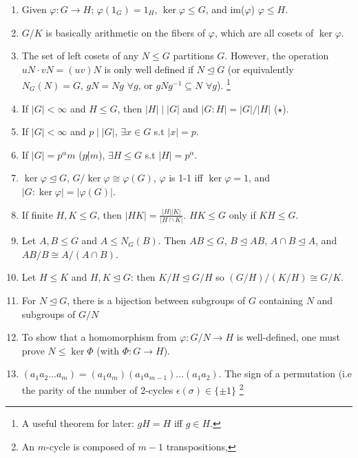 \documentclass{article}
\begin{document}
\begin{enumerate}[1.]
    \item Given $\varphi : G \rightarrow H$; $\varphi(1_G) = 1_H$,
        $\ker \varphi \leq G$, and im($\varphi$) $\varphi \leq H$.
    \item $G/K$ is basically arithmetic on the fibers of $\varphi$, which
        are all cosets of $\ker \varphi$.
    \item The set of left cosets of any $N \leq G$ partitions $G$. However,
        the operation $uN \cdot vN = (uv)N$ is only well defined if $N
        \trianglelefteq G$ (or equivalently $N_G(N) = G$, $gN = Ng$ $\forall
        g$, or $gNg^{-1} \subseteq N$ $\forall g$).
        \footnote{A useful theorem for later: $gH = H$ iff $g \in H$.}
    \item If $|G| < \infty$ and $H \leq G$, then $|H| \mid |G|$ and
        $|G : H| = |G|/|H|$ ($\star$).
    \item If $|G| < \infty$ and $p \mid |G|$, $\exists x \in G$ s.t $|x| =
        p$.
    \item If $|G| = p^{\alpha}m$ ($p \not| m$), $\exists H \leq G$ s.t $|H|
        = p^{\alpha}$.
    \item $\ker \varphi \trianglelefteq G$, $G/\ker \varphi \cong
        \varphi(G)$, $\varphi$ is 1-1 iff $\ker \varphi = 1$, and
        $|G : \ker \varphi| = |\varphi(G)|$.
    \item If finite $H, K \leq G$, then $|HK| = \frac{|H||K|}{|H \cap K|}$.
        $HK \leq G$ only if $KH \leq G$.
    \item Let $A,B \leq G$ and $A \leq N_G(B)$. Then $AB \leq G$, $B
        \trianglelefteq AB$, $A \cap B \trianglelefteq A$, and $AB/B \cong
        A/(A \cap B)$.
    \item Let $H \leq K$ and $H,K \trianglelefteq G$: then $K/H
        \trianglelefteq G/H$ so $(G/H)/(K/H) \cong G/K$.
    \item For $N \trianglelefteq G$, there is a bijection between subgroups of
    $G$ containing $N$ and subgroups of $G/N$
    \item To show that a homomorphism from $\varphi : G/N \rightarrow H$ is
        well-defined, one must prove $N \leq \ker \Phi$ (with $\Phi : G
        \rightarrow H$).
    \item $(a_1 a_2 ... a_m) = (a_1 a_m)(a_1 a_{m-1})...(a_1 a_2)$.
        The sign of a permutation (i.e the parity of the number of
        2-cycles $\epsilon(\sigma) \in \{\pm 1\}$
        \footnote{An $m$-cycle is composed of $m-1$ transpositions,
}
\end{enumerate}
\end{document}
